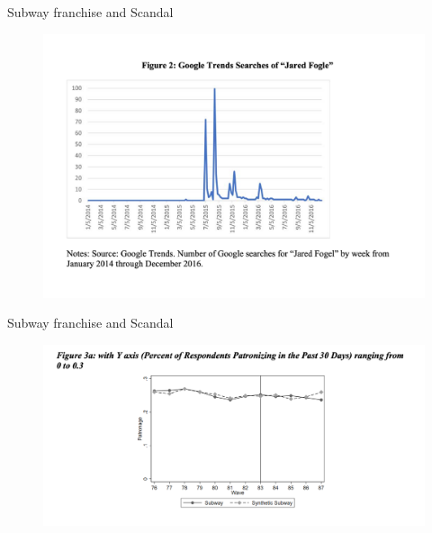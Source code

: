 \documentclass{beamer}
\begin{document}
\begin{frame}{Subway franchise and Scandal}

	\begin{figure}
	\includegraphics[scale=0.25]{./lecture_includes/subway_2.png}
	\end{figure}

\end{frame}

\begin{frame}{Subway franchise and Scandal}

	\begin{figure}
	\includegraphics[scale=0.3]{./lecture_includes/subway_3.png}
	\end{figure}

\end{frame}
\end{document}

